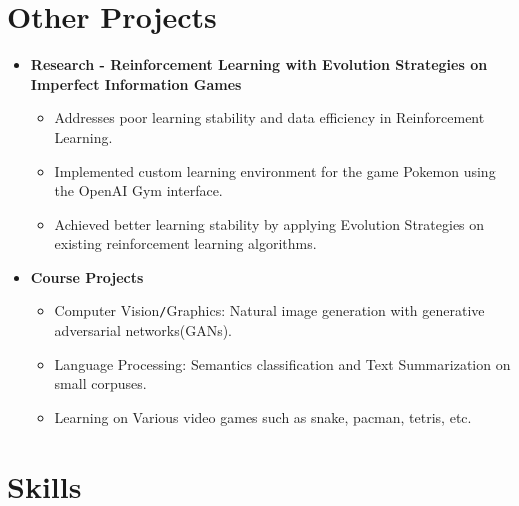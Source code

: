 \section{Other Projects}
\vspace{5pt}
\begin{itemize}[leftmargin=*]
    \item{\textbf{Research - Reinforcement Learning with Evolution Strategies on Imperfect Information Games}}
        \begin{itemize}
                \vspace{-5pt}
                \item Addresses poor learning stability and data efficiency in Reinforcement Learning.
                \item Implemented custom learning environment for the game Pokemon using the OpenAI Gym interface. 
                \item Achieved better learning stability by applying Evolution Strategies on existing reinforcement learning algorithms.
        \end{itemize}
    \vspace{-10pt}
    \item{\textbf{Course Projects}}
        \begin{itemize}
                \vspace{-5pt}
                \item Computer Vision\texttt{/}Graphics: Natural image generation with generative adversarial networks(GANs).
                \item Language Processing: Semantics classification and Text Summarization on small corpuses.
                \item Learning on Various video games such as snake, pacman, tetris, etc.
        \end{itemize}
\end{itemize}
\vspace{5pt}

\section{Skills}
\vspace{5pt}
\begin{itemize}[leftmargin=*]
\end{itemize}



